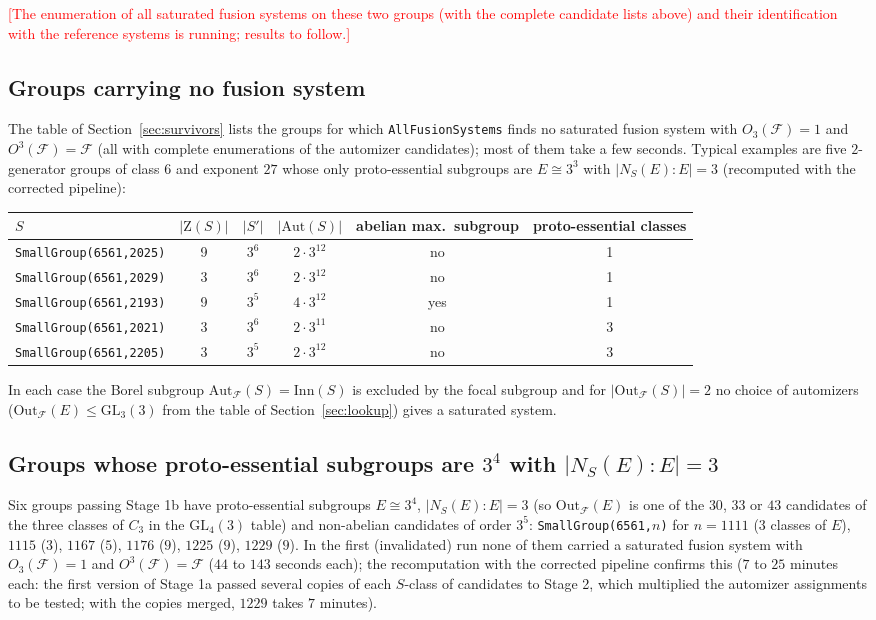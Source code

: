 \documentclass[11pt]{article}
\theoremstyle{definition}
\theoremstyle{remark}
\newcommand{\F}{\mathcal{F}}
\newcommand{\Aut}{\mathrm{Aut}}
\newcommand{\Out}{\mathrm{Out}}
\newcommand{\Inn}{\mathrm{Inn}}
\newcommand{\GL}{\mathrm{GL}}
\newcommand{\Z}{\mathrm{Z}}
\begin{document}
\textcolor{red}{[The enumeration of all saturated fusion systems on these two
groups (with the complete candidate lists above) and their identification
with the reference systems is running; results to follow.]}

\subsection{Groups carrying no fusion system}
\label{sec:class6none}

The table of Section~\ref{sec:survivors} lists the groups for which
\texttt{AllFusionSystems} finds no saturated fusion system with
$O_3(\F)=1$ and $O^3(\F)=\F$ (all with complete enumerations of the
automizer candidates); most of them take a few seconds.  Typical examples
are five $2$-generator groups of class $6$ and exponent $27$ whose only
proto-essential subgroups are $E\cong 3^3$ with $|N_S(E):E|=3$ (recomputed
with the corrected pipeline):
\begin{center}
\begin{tabular}{lccccc}
\toprule
$S$ & $|\Z(S)|$ & $|S'|$ & $|\Aut(S)|$ & abelian max.\ subgroup & proto-essential classes\\
\midrule
\texttt{SmallGroup(6561,2025)} & 9 & $3^6$ & $2\cdot3^{12}$ & no & 1\\
\texttt{SmallGroup(6561,2029)} & 3 & $3^6$ & $2\cdot3^{12}$ & no & 1\\
\texttt{SmallGroup(6561,2193)} & 9 & $3^5$ & $4\cdot3^{12}$ & yes & 1\\
\texttt{SmallGroup(6561,2021)} & 3 & $3^6$ & $2\cdot3^{11}$ & no & 3\\
\texttt{SmallGroup(6561,2205)} & 3 & $3^5$ & $2\cdot3^{12}$ & no & 3\\
\bottomrule
\end{tabular}
\end{center}
In each case the Borel subgroup $\Aut_\F(S)=\Inn(S)$ is excluded by the
focal subgroup and for $|\Out_\F(S)|=2$ no choice of automizers
($\Out_\F(E)\le\GL_3(3)$ from the table of Section~\ref{sec:lookup}) gives a
saturated system.

\subsection{Groups whose proto-essential subgroups are $3^4$ with $|N_S(E):E|=3$}
\label{sec:tier81}

Six groups passing Stage 1b have proto-essential subgroups $E\cong 3^4$,
$|N_S(E):E|=3$ (so $\Out_\F(E)$ is one of the $30$, $33$ or $43$ candidates
of the three classes of $C_3$ in the $\GL_4(3)$ table) and non-abelian
candidates of order $3^5$: \texttt{SmallGroup(6561,}$n$\texttt{)} for
$n=1111$ ($3$ classes of $E$), $1115$ ($3$), $1167$ ($5$), $1176$ ($9$),
$1225$ ($9$), $1229$ ($9$).  In the first (invalidated) run none of them
carried a saturated fusion system with $O_3(\F)=1$ and $O^3(\F)=\F$ ($44$
to $143$ seconds each); the recomputation with the corrected pipeline
confirms this ($7$ to $25$ minutes each: the first version of Stage 1a
passed several copies of each $S$-class of candidates to Stage 2, which
multiplied the automizer assignments to be tested; with the copies merged,
$1229$ takes $7$ minutes).
\end{document}
